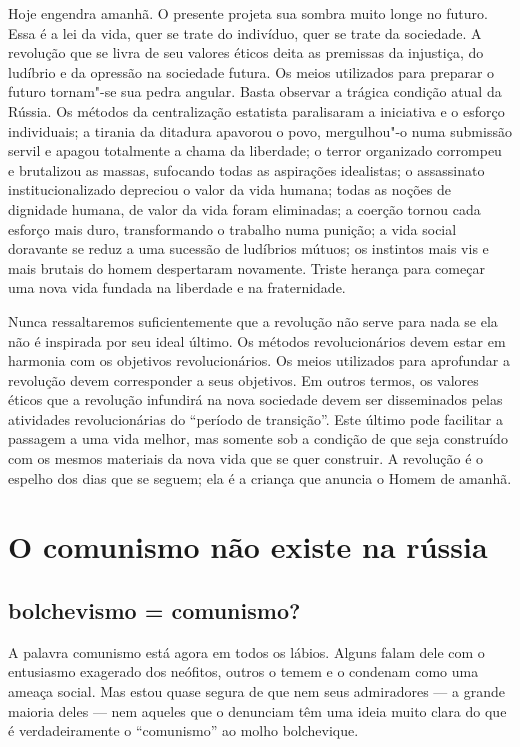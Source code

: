 Hoje engendra amanhã. O presente projeta sua sombra muito longe no
futuro. Essa é a lei da vida, quer se trate do indivíduo, quer se trate
da sociedade. A revolução que se livra de seu valores éticos deita as
premissas da injustiça, do ludíbrio e da opressão na sociedade futura.
Os meios utilizados para preparar o futuro tornam"-se sua pedra
angular. Basta observar a trágica condição atual da Rússia. Os métodos
da centralização estatista paralisaram a iniciativa e o esforço
individuais; a tirania da ditadura apavorou o povo, mergulhou"-o numa
submissão servil e apagou totalmente a chama da liberdade; o terror
organizado corrompeu e brutalizou as massas, sufocando todas as
aspirações idealistas; o assassinato institucionalizado depreciou o
valor da vida humana; todas as noções de dignidade humana, de valor da
vida foram eliminadas; a coerção tornou cada esforço mais duro,
transformando o trabalho numa punição; a vida social doravante se reduz
a uma sucessão de ludíbrios mútuos; os instintos mais vis e mais
brutais do homem despertaram novamente. Triste herança para começar uma
nova vida fundada na liberdade e na fraternidade.

Nunca ressaltaremos suficientemente que a revolução não serve para nada
se ela não é inspirada por seu ideal último. Os métodos revolucionários
devem estar em harmonia com os objetivos revolucionários. Os meios
utilizados para aprofundar a revolução devem corresponder a seus
objetivos. Em outros termos, os valores éticos que a revolução
infundirá na nova sociedade devem ser disseminados pelas atividades
revolucionárias do “período de transição”. Este último pode facilitar a
passagem a uma vida melhor, mas somente sob a condição de que seja
construído com os mesmos materiais da nova vida que se quer
construir. A revolução é o espelho dos dias que se seguem; ela é a
criança que anuncia o Homem de amanhã.

\chapter{O comunismo não existe na rússia}

\vspace*{-.8em}

\section*{bolchevismo = comunismo?}
A palavra comunismo está agora em todos os lábios. Alguns falam dele com
o entusiasmo exagerado dos neófitos, outros o temem e o condenam como
uma ameaça social. Mas estou quase segura de que nem seus admiradores
--- a grande maioria deles --- nem aqueles que o denunciam têm uma ideia
muito clara do que é verdadeiramente o “comunismo” ao molho
bolchevique.

